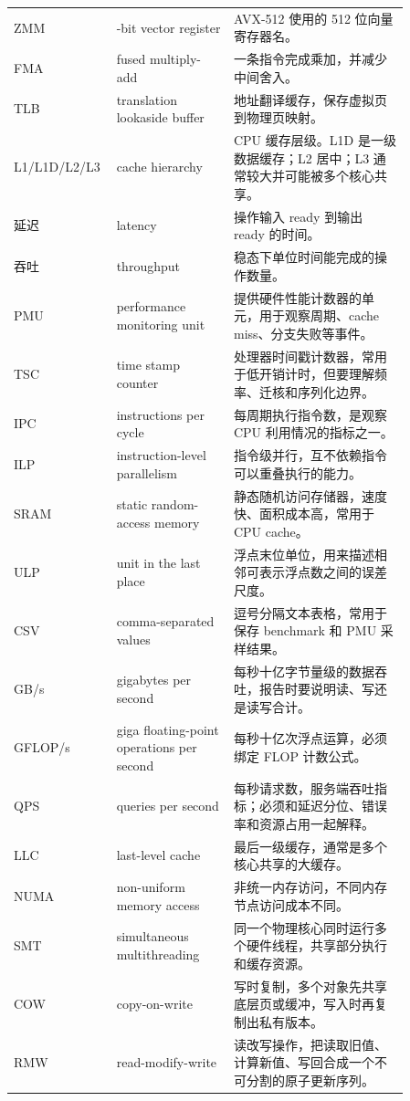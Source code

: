 {\begin{longtable}{
  >{\raggedright\arraybackslash}p{0.16\linewidth}
  >{\raggedright\arraybackslash}p{0.28\linewidth}
  >{\raggedright\arraybackslash}p{0.42\linewidth}
}
ZMM & 512-bit vector register & AVX-512 使用的 512 位向量寄存器名。 \\
FMA & fused multiply-add & 一条指令完成乘加，并减少中间舍入。 \\
TLB & translation lookaside buffer & 地址翻译缓存，保存虚拟页到物理页映射。 \\
L1/L1D/L2/L3 & cache hierarchy & CPU 缓存层级。L1D 是一级数据缓存；L2 居中；L3 通常较大并可能被多个核心共享。 \\
延迟 & latency & 操作输入 ready 到输出 ready 的时间。 \\
吞吐 & throughput & 稳态下单位时间能完成的操作数量。 \\
PMU & performance monitoring unit & 提供硬件性能计数器的单元，用于观察周期、cache miss、分支失败等事件。 \\
TSC & time stamp counter & 处理器时间戳计数器，常用于低开销计时，但要理解频率、迁核和序列化边界。 \\
IPC & instructions per cycle & 每周期执行指令数，是观察 CPU 利用情况的指标之一。 \\
ILP & instruction-level parallelism & 指令级并行，互不依赖指令可以重叠执行的能力。 \\
SRAM & static random-access memory & 静态随机访问存储器，速度快、面积成本高，常用于 CPU cache。 \\
ULP & unit in the last place & 浮点末位单位，用来描述相邻可表示浮点数之间的误差尺度。 \\
CSV & comma-separated values & 逗号分隔文本表格，常用于保存 benchmark 和 PMU 采样结果。 \\
GB/s & gigabytes per second & 每秒十亿字节量级的数据吞吐，报告时要说明读、写还是读写合计。 \\
GFLOP/s & giga floating-point operations per second & 每秒十亿次浮点运算，必须绑定 FLOP 计数公式。 \\
QPS & queries per second & 每秒请求数，服务端吞吐指标；必须和延迟分位、错误率和资源占用一起解释。 \\
LLC & last-level cache & 最后一级缓存，通常是多个核心共享的大缓存。 \\
NUMA & non-uniform memory access & 非统一内存访问，不同内存节点访问成本不同。 \\
SMT & simultaneous multithreading & 同一个物理核心同时运行多个硬件线程，共享部分执行和缓存资源。 \\
COW & copy-on-write & 写时复制，多个对象先共享底层页或缓冲，写入时再复制出私有版本。 \\
RMW & read-modify-write & 读改写操作，把读取旧值、计算新值、写回合成一个不可分割的原子更新序列。 \\

\end{longtable}}
